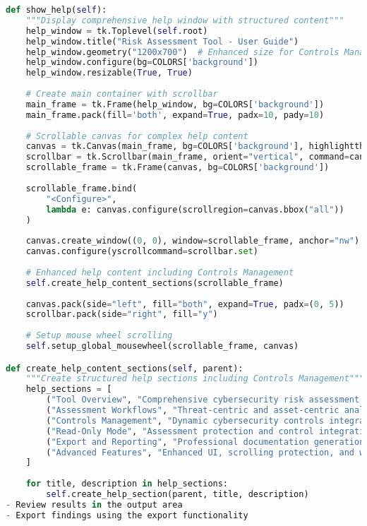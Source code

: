 \documentclass[binding=0.6cm]{sapthesis}
\begin{document}
\begin{lstlisting}[language=Python, caption=Enhanced Help System Implementation]
def show_help(self):
    """Display comprehensive help window with structured content"""
    help_window = tk.Toplevel(self.root)
    help_window.title("Risk Assessment Tool - User Guide")
    help_window.geometry("1200x700")  # Enhanced size for Controls Management help
    help_window.configure(bg=COLORS['background'])
    help_window.resizable(True, True)
    
    # Create main container with scrollbar
    main_frame = tk.Frame(help_window, bg=COLORS['background'])
    main_frame.pack(fill='both', expand=True, padx=10, pady=10)
    
    # Scrollable canvas for complex help content
    canvas = tk.Canvas(main_frame, bg=COLORS['background'], highlightthickness=0)
    scrollbar = tk.Scrollbar(main_frame, orient="vertical", command=canvas.yview)
    scrollable_frame = tk.Frame(canvas, bg=COLORS['background'])
    
    scrollable_frame.bind(
        "<Configure>",
        lambda e: canvas.configure(scrollregion=canvas.bbox("all"))
    )
    
    canvas.create_window((0, 0), window=scrollable_frame, anchor="nw")
    canvas.configure(yscrollcommand=scrollbar.set)
    
    # Enhanced help content including Controls Management
    self.create_help_content_sections(scrollable_frame)
    
    canvas.pack(side="left", fill="both", expand=True, padx=(0, 5))
    scrollbar.pack(side="right", fill="y")
    
    # Setup mouse wheel scrolling
    self.setup_global_mousewheel(scrollable_frame, canvas)

def create_help_content_sections(self, parent):
    """Create structured help sections including Controls Management"""
    help_sections = [
        ("Tool Overview", "Comprehensive cybersecurity risk assessment capabilities"),
        ("Assessment Workflows", "Threat-centric and asset-centric analysis modes"),
        ("Controls Management", "Dynamic cybersecurity controls integration with real-time impact analysis"),
        ("Read-Only Mode", "Assessment protection and control integration consistency"),
        ("Export and Reporting", "Professional documentation generation"),
        ("Advanced Features", "Enhanced UI, scrolling protection, and workflow optimization")
    ]
    
    for title, description in help_sections:
        self.create_help_section(parent, title, description)
- Review results in the output area
- Export findings using the export functionality


\end{lstlisting}
\end{document}
